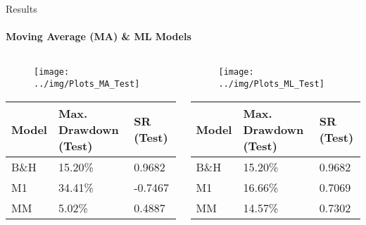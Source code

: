 \documentclass{beamer} %
\begin{document}
\begin{frame}{Results}
\framesubtitle{Moving Average (MA) \& ML Models}

	\begin{columns}
		
		\begin{column}{.45\textwidth}
			\begin{figure}
			\centering
				\texttt{[image: ../img/Plots\_MA\_Test]}
			\end{figure}
		
		
		\begin{table}[htbp]
			\tiny
			\centering
			\begin{tabular}{ |C{1cm}|C{2cm}|C{1.5cm}| }
				\hline
				Model & Max. Drawdown (Test) & SR (Test)\\
				\hline
				B\&H & 15.20\% & 0.9682\\ 
				M1 & 34.41\% & -0.7467\\ 
				MM & 5.02\% 	& 0.4887\\ 
				\hline
			\end{tabular}
		\end{table}

		\end{column}		
		
		\begin{column}{.45\textwidth}
			\begin{figure}
			\centering
				\texttt{[image: ../img/Plots\_ML\_Test]}
			\end{figure}
			
			\begin{table}[htbp]
			\tiny
			\centering
			\begin{tabular}{ |C{1cm}|C{2cm}|C{1.5cm}| }
				\hline
				Model & Max. Drawdown (Test) & SR (Test)\\
				\hline
				B\&H & 15.20\% & 0.9682\\ 
				M1 & 16.66\% & 0.7069\\ 
				MM & 14.57\% & 0.7302\\ 
				\hline
			\end{tabular}
			\end{table}			
			
		\end{column}		

	\end{columns}

	\vspace{.2cm}
	

\end{frame}

% 
\end{document}
